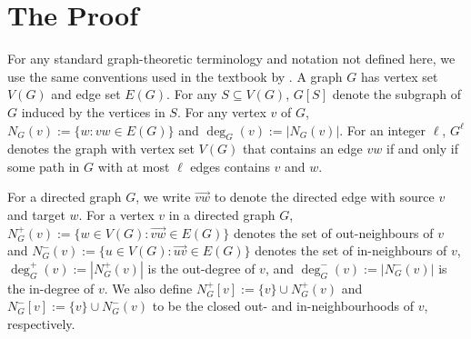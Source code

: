 \documentclass{patmorin}
\begin{document}
\section{The Proof}

For any standard graph-theoretic terminology and notation not defined here, we use the same conventions used in the textbook by \citet{diestel:graph}.  A graph $G$ has vertex set $V(G)$ and edge set $E(G)$.  For any $S\subseteq V(G)$, $G[S]$ denote the subgraph of $G$ induced by the vertices in $S$.  For any vertex $v$ of $G$, $N_G(v):=\{w:vw\in E(G)\}$ and $\deg_G(v):=|N_G(v)|$.  For an integer $\ell$, $G^\ell$ denotes the graph with vertex set $V(G)$ that contains an edge $vw$ if and only if some path in $G$ with at most $\ell$ edges contains $v$ and $w$.

For a directed graph $G$, we write $\overrightarrow{vw}$ to denote the directed edge with source $v$ and target $w$.  For a vertex $v$ in a directed graph $G$, $N^+_{G}(v):=\{w\in V(G):\overrightarrow{vw}\in E(G)\}$ denotes the set of out-neighbours of $v$ and $N^-_G(v):=\{u\in V(G):\overrightarrow{uv}\in E(G)\}$ denotes the set of in-neighbours of $v$, $\deg^+_{G}(v):=|N^+_G(v)|$ is the out-degree of $v$, and $\deg^-_{G}(v):=|N^-_G(v)|$ is the in-degree of $v$.  We also define $N^+_{G}[v]:=\{v\}\cup N^+_{G}(v)$ and $N^-_{G}[v]:=\{v\}\cup N^-_{G}(v)$ to be the closed out- and in-neighbourhoods of $v$, respectively.
\end{document}

